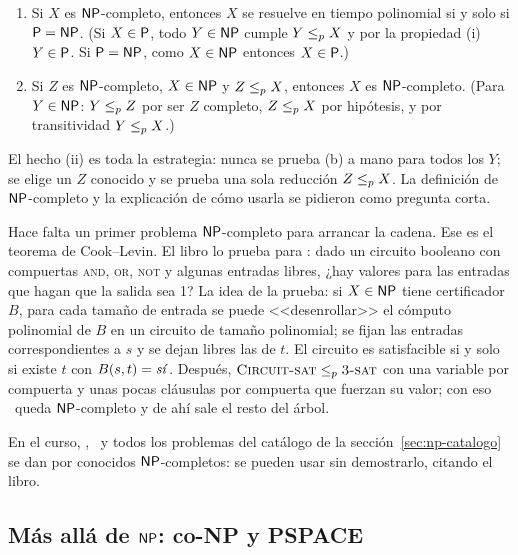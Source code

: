 \begin{resultado}
\begin{enumerate}[label=(\roman*)]
  \item Si $X$ es $\NP$-completo, entonces $X$ se resuelve en tiempo polinomial si y solo si $\Pclass=\NP$. (Si $X\in\Pclass$, todo $Y\in\NP$ cumple $Y\redp X$ y por la propiedad (i) $Y\in\Pclass$. Si $\Pclass=\NP$, como $X\in\NP$ entonces $X\in\Pclass$.)
  \item Si $Z$ es $\NP$-completo, $X\in\NP$ y $Z\redp X$, entonces $X$ es $\NP$-completo. (Para $Y\in\NP$: $Y\redp Z$ por ser $Z$ completo, $Z\redp X$ por hipótesis, y por transitividad $Y\redp X$.)
\end{enumerate}
\end{resultado}

El hecho (ii) es toda la estrategia: nunca se prueba (b) a mano para todos los $Y$; se elige un $Z$ conocido y se prueba una sola reducción $Z\redp X$. La definición de $\NP$-completo y la explicación de cómo usarla se pidieron como pregunta corta.

Hace falta un primer problema $\NP$-completo para arrancar la cadena. Ese es el teorema de Cook--Levin. El libro lo prueba para : dado un circuito booleano con compuertas \textsc{and}, \textsc{or}, \textsc{not} y algunas entradas libres, ¿hay valores para las entradas que hagan que la salida sea 1? La idea de la prueba: si $X\in\NP$ tiene certificador $B$, para cada tamaño de entrada se puede <<desenrollar>> el cómputo polinomial de $B$ en un circuito de tamaño polinomial; se fijan las entradas correspondientes a $s$ y se dejan libres las de $t$. El circuito es satisfacible si y solo si existe $t$ con $B(s,t)=\text{\npsi}$. Después, $\prob{Circuit-sat}\redp\npTSAT$ con una variable por compuerta y unas pocas cláusulas por compuerta que fuerzan su valor; con eso \npTSAT\ queda $\NP$-completo y de ahí sale el resto del árbol.

En el curso, \npSAT, \npTSAT\ y todos los problemas del catálogo de la sección~\ref{sec:np-catalogo} se dan por conocidos $\NP$-completos: se pueden usar sin demostrarlo, citando el libro.

\subsection{Más allá de \texorpdfstring{$\NP$}{NP}: co-NP y PSPACE}

